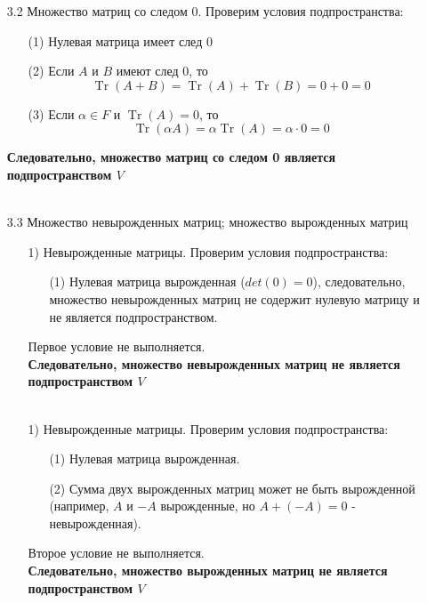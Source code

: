 \documentclass[a4paper]{article}
\begin{document}
\begin{enumerate}
\begin{enumerate}
        \item[3.2]Множество матриц со следом 0. Проверим условия подпространства:
        \begin{enumerate}
            \item[(1)] Нулевая матрица имеет след 0
            \item[(2)] Если \( A \) и \( B \) имеют след 0, то
            $$\operatorname{Tr}(A + B) = \operatorname{Tr}(A) + \operatorname{Tr}(B) = 0 + 0 = 0$$
            \item[(3)]Если \( \alpha \in F \) и \( \operatorname{Tr}(A) = 0 \), то 
            $$\operatorname{Tr}(\alpha A) = \alpha \operatorname{Tr}(A) = \alpha \cdot 0 = 0$$
        \end{enumerate}
        \textbf{Следовательно, множество матриц со следом 0 является подпространством $V$}\\\\

        \item[3.3]Множество невырожденных матриц; множество вырожденных матриц
        \begin{enumerate}
            \item[1)]Невырожденные матрицы. Проверим условия подпространства:
            \begin{enumerate}
                \item[(1)]Нулевая матрица вырожденная (\( det(0) = 0 \)), следовательно, множество невырожденных матриц не содержит нулевую матрицу и не является подпространством.
            \end{enumerate}
            Первое условие не выполняется.\\
            \textbf{Следовательно, множество невырожденных матриц не является подпространством $V$}\\\\
            
            \item[1)]Невырожденные матрицы. Проверим условия подпространства:
            \begin{enumerate}
                \item[(1)]Нулевая матрица вырожденная.
                \item[(2)]Сумма двух вырожденных матриц может не быть вырожденной (например, \( A \) и \( -A \) вырожденные, но \( A + (-A) = 0 \) - невырожденная).
            \end{enumerate}
            Второе условие не выполняется.\\
            \textbf{Следовательно, множество вырожденных матриц не является подпространством $V$}\\\\
        \end{enumerate}
    \end{enumerate}


\end{enumerate}
\end{document}
